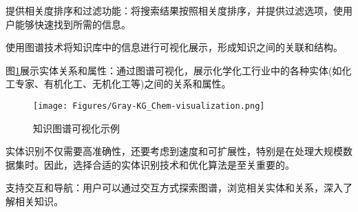 提供相关度排序和过滤功能：将搜索结果按照相关度排序，并提供过滤选项，使用户能够快速找到所需的信息。

使用图谱技术将知识库中的信息进行可视化展示，形成知识之间的关联和结构。

图\ref{Fig:KG-Chem_visualization}展示实体关系和属性：通过图谱可视化，展示化学化工行业中的各种实体(如化工专家、有机化工、无机化工等)之间的关系和属性。
\begin{figure}[h!]
\centering
\texttt{[image: Figures/Gray-KG\_Chem-visualization.png]}
\caption{\small\textrm{知识图谱可视化示例}}%
\label{Fig:KG-Chem_visualization}
\end{figure}
实体识别不仅需要高准确性，还要考虑到速度和可扩展性，特别是在处理大规模数据集时。因此，选择合适的实体识别技术和优化算法是至关重要的。

支持交互和导航：用户可以通过交互方式探索图谱，浏览相关实体和关系，深入了解相关知识。


